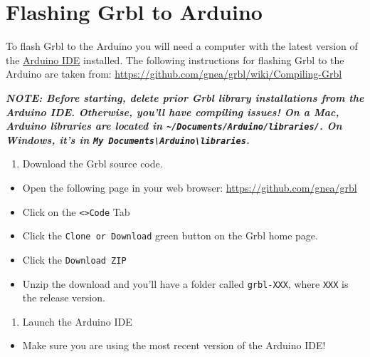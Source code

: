 \documentclass[]{book}
\providecommand{\tightlist}{%
  \setlength{\itemsep}{0pt}\setlength{\parskip}{0pt}}
\theoremstyle{definition}
\theoremstyle{definition}
\theoremstyle{remark}
\begin{document}
\section{Flashing Grbl to Arduino}\label{flashing-grbl-to-arduino}

To flash Grbl to the Arduino you will need a computer with the latest
version of the \href{https://www.arduino.cc/en/Main/Software}{Arduino
IDE} installed. The following instructions for flashing Grbl to the
Arduino are taken from:
\url{https://github.com/gnea/grbl/wiki/Compiling-Grbl}

\emph{\textbf{NOTE: Before starting, delete prior Grbl library
installations from the Arduino IDE. Otherwise, you'll have compiling
issues! On a Mac, Arduino libraries are located in
\texttt{\textasciitilde{}/Documents/Arduino/libraries/}. On Windows,
it's in
\texttt{My\ Documents\textbackslash{}Arduino\textbackslash{}libraries}.}}

\begin{enumerate}
\def\labelenumi{\arabic{enumi}.}
\tightlist
\item
  Download the Grbl source code.
\end{enumerate}

\begin{itemize}
\tightlist
\item
  Open the following page in your web browser:
  \url{https://github.com/gnea/grbl}
\item
  Click on the \texttt{\textless{}\textgreater{}Code} Tab
\item
  Click the \texttt{Clone\ or\ Download} green button on the Grbl home
  page.
\item
  Click the \texttt{Download\ ZIP}
\item
  Unzip the download and you'll have a folder called \texttt{grbl-XXX},
  where \texttt{XXX} is the release version.
\end{itemize}

\begin{enumerate}
\def\labelenumi{\arabic{enumi}.}
\setcounter{enumi}{1}
\tightlist
\item
  Launch the Arduino IDE
\end{enumerate}

\begin{itemize}
\tightlist
\item
  Make sure you are using the most recent version of the Arduino IDE!
\end{itemize}
\end{document}

